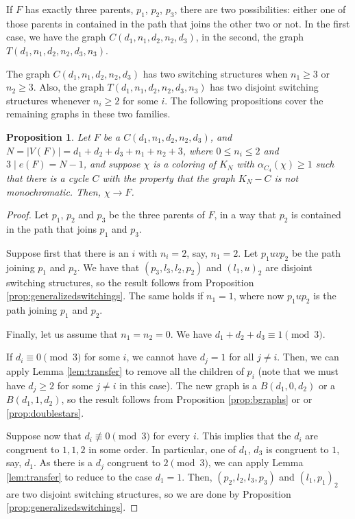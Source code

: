 \documentclass[11pt]{article}
\newtheorem{proposition}[theorem]{Proposition}
\begin{document}
If $F$ has exactly three parents, $p_1$, $p_2$, $p_3$, there are two possibilities: either one of those parents in contained in the path that joins the other two or not. In the first case, we have the graph $C(d_1,n_1,d_2,n_2,d_3)$, in the second, the graph $T(d_1,n_1,d_2,n_2,d_3,n_3)$.

The graph $C(d_1,n_1,d_2,n_2,d_3)$ has two switching structures when $n_1 \geq 3$ or $n_2 \geq 3$. Also, the graph $T(d_1,n_1, d_2,n_2,d_3,n_3)$ has two disjoint switching structures whenever $n_i \geq 2$ for some $i$. The following propositions cover the remaining graphs in these two families.

\begin{proposition}\label{prop:cgraphs}
    Let $F$ be a $C(d_1,n_1,d_2,n_2,d_3)$, and $N=|V(F)|=d_1+d_2+d_3+n_1+n_2+3$, where $0 \leq n_i \leq 2$ and $3 \mid e(F) = N-1$, and suppose $\chi$ is a coloring of $K_{N}$ with $\alpha_{C_4}(\chi) \geq 1$ such that there is a cycle $C$ with the property that the graph $K_{N}-C$ is not monochromatic. Then, $\chi \rightarrow F$.
\end{proposition}

\begin{proof}
    Let $p_1$, $p_2$ and $p_3$ be the three parents of $F$, in a way that $p_2$ is contained in the path that joins $p_1$ and $p_3$. 

    Suppose first that there is an $i$ with $n_i = 2$, say, $n_1 =2$. Let $p_1uvp_2$ be the path joining $p_1$ and $p_2$. We have that $(p_3,l_3,l_2,p_2)$ and $(l_1,u)_2$ are disjoint switching structures, so the result follows from Proposition \ref{prop:generalizedswitchings}. The same holds if $n_1=1$, where now $p_1up_2$ is the path joining $p_1$ and $p_2$. 

    \medskip
    
    Finally, let us assume that $n_1=n_2=0$. We have $d_1+d_2+d_3 \equiv 1 \pmod 3$.

    If $d_i \equiv 0 \pmod 3$ for some $i$, we cannot have $d_j=1$ for all $j \neq i$. Then, we can apply Lemma \ref{lem:transfer} to remove all the children of $p_i$ (note that we must have $d_j \geq 2$ for some $j \neq i$ in this case). The new graph is a $B(d_1,0,d_2)$ or a $B(d_1,1,d_2)$, so the result follows from Proposition \ref{prop:bgraphs} or  or \ref{prop:doublestars}.

    Suppose now that $d_i \not\equiv 0 \pmod 3$ for every $i$. This implies that the $d_i$ are congruent to $1,1,2$ in some order. In particular, one of $d_1$, $d_3$ is congruent to $1$, say, $d_1$. As there is a $d_j$ congruent to $2 \pmod 3$, we can apply Lemma \ref{lem:transfer} to reduce to the case $d_1=1$. Then, $(p_2,l_2,l_3,p_3)$ and $(l_1,p_1)_2$ are two disjoint switching structures, so we are done by Proposition \ref{prop:generalizedswitchings}.
    
\end{proof}
\end{document}
